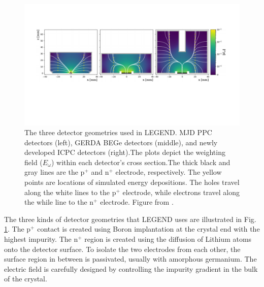 \begin{figure}
  \includegraphics[trim=10 30 10 20,clip,width=\linewidth]{ch2/figs/Det-geo-2.pdf}
\caption{The three detector geometries used in LEGEND. MJD PPC detectors (left), GERDA BEGe detectors (middle), and newly developed ICPC detectors (right).The plots depict the weighting field ($E_\omega$) within each detector's cross section.The thick black and gray lines are the p$^+$ and n$^+$ electrode, respectively. The yellow points are locations of simulated energy depositions. The holes travel along the white lines to the p$^+$ electrode, while electrons travel along the while line to the n$^+$ electrode. Figure from \cite{Comellato:2020ljj}.}
\label{fig:det-compare}
  \end{figure}
  
The three kinds of detector geometries that LEGEND uses are illustrated in Fig. \ref{fig:det-compare}. The p$^+$ contact is created using Boron implantation at the crystal end with the highest impurity. The n$^+$ region is created using the diffusion of Lithium atoms onto the detector surface. To isolate the two electrodes from each other, the surface region in between is passivated, usually with amorphous germanium. The electric field is carefully designed by controlling the impurity gradient in the bulk of the crystal. 

